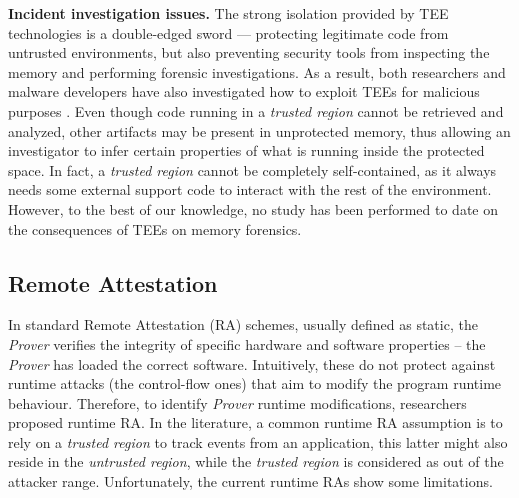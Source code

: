 \vspace{0.5cm}
\noindent \textbf{Incident investigation issues.}
The strong isolation provided by TEE technologies is a double-edged
sword --- protecting legitimate code from untrusted environments,
but also preventing security tools from inspecting the memory and performing
forensic investigations. 
As a result, both researchers and malware developers have also investigated how 
to exploit TEEs for malicious purposes 
\citep{thoughs-on-intel1,thoughs-on-intel2,sgxrop,snakegx,sgxsidechannel}.
Even though code running in a \emph{trusted region} cannot be retrieved and 
analyzed, other artifacts may be present in unprotected memory, thus allowing 
an investigator to infer certain properties of what is running inside the 
protected space.
In fact, a \emph{trusted region} cannot be completely self-contained, as it 
always needs some external support code to interact with the rest of the 
environment.
However, to the best of our knowledge, no study has been performed to date on 
the consequences of TEEs on memory forensics.

\subsection{Remote Attestation}

In standard Remote Attestation (RA) schemes, usually defined as static, the 
\emph{Prover} verifies the integrity of specific hardware and 
software properties -- the \emph{Prover} has loaded the correct software.
Intuitively, these do not protect against runtime attacks (\eg the 
control-flow ones) that aim to modify the program runtime behaviour. 
Therefore, to identify \emph{Prover} runtime modifications, researchers 
proposed runtime RA.
In the literature, a common runtime RA assumption is to rely on a \emph{trusted 
region} to track events from an application, this latter might also reside in 
the \emph{untrusted region}, while the \emph{trusted region} is considered as 
out of the attacker range.
Unfortunately, the current runtime RAs show some limitations.

